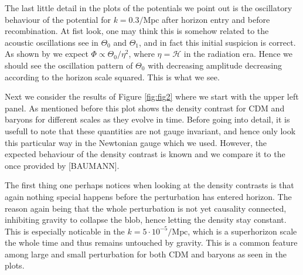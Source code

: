 \documentclass[twocolumn]{aastex62}
\begin{document}
The last little detail in the plots of the potentials we point out is the oscillatory behaviour of the potential for $k = 0.3/\mathrm{Mpc}$ after horizon entry and before recombination. At fist look, one may think this is somehow related to the acoustic oscillations see in $\Theta_0$ and $\Theta_1$, and in fact this initial suspicion is correct. As shown by \cite{dodelson:2003} we expect $\Phi \propto \Theta_0 / \eta^2$, where $\eta = \mathcal{H}$ in the radiation era. Hence we should see the oscillation pattern of $\Theta_0$ with decreasing amplitude decreasing according to the horizon scale squared. This is what we see.

Next we consider the results of Figure \ref{fig:fig2} where we start with the upper left panel. As mentioned before this plot shows the density contrast for CDM and baryons for different scales as they evolve in time. Before going into detail, it is usefull to note that these quantities are not gauge invariant, and hence only look this particular way in the Newtonian gauge which we used. However, the expected behaviour of the density contrast is known and we compare it to the once provided by [BAUMANN]. 

The first thing one perhaps notices when looking at the density contrasts is that again nothing special happens before the perturbation has entered horizon. The reason again being that the whole perturbation is not yet causality connected, inhibiting gravity to collapse the blob, hence letting the density stay constant. This is especially noticable in the $k = 5\cdot 10^{-5} / \mathrm{Mpc}$, which is a superhorizon scale the whole time and thus remains untouched by gravity. This is a common feature among large and small perturbation for both CDM and baryons as seen in the plots. 
\end{document}
